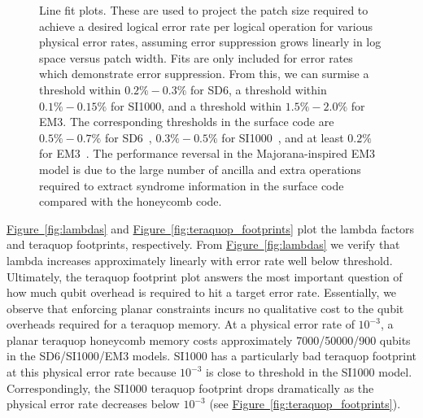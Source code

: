 \documentclass[onecolumn,unpublished,a4paper]{quantumarticle}
\theoremstyle{definition}
\theoremstyle{definition}
\theoremstyle{definition}
\newcommand{\fig}[1]{\hyperref[fig:#1]{Figure~\ref*{fig:#1}}}
\begin{document}
\begin{figure}[ht!]
    \centering
    \caption{
    Line fit plots.
    These are used to project the patch size required to achieve a desired logical error rate per logical operation for various physical error rates, assuming error suppression grows linearly in log space versus patch width.
    Fits are only included for error rates which demonstrate error suppression.  From this, we can surmise a threshold within $0.2\%-0.3\%$ for SD6, a threshold within $0.1\%-0.15\%$ for SI1000, and a threshold within $1.5\%-2.0\% $ for EM3.  
    The corresponding thresholds in the surface code are $0.5\%-0.7\%$ for SD6~\cite{gidney2021honeycombmemory}, $0.3\%-0.5\%$ for SI1000~\cite{gidney2021honeycombmemory}, and at least $0.2\%$ for EM3~\cite{chao2020optimization}.
    The performance reversal in the Majorana-inspired EM3 model is due to the large number of ancilla and extra operations required to extract syndrome information in the surface code compared with the honeycomb code.
    }
    \label{fig:line_fits}
\end{figure}

\fig{lambdas} and \fig{teraquop_footprints} plot the lambda factors and teraquop footprints, respectively.  
From \fig{lambdas} we verify that lambda increases approximately linearly with error rate well below threshold.
Ultimately, the teraquop footprint plot answers the most important question of how much qubit overhead is required to hit a target error rate.
Essentially, we observe that enforcing planar constraints incurs no qualitative cost to the qubit overheads required for a teraquop memory.
At a physical error rate of $10^{-3}$, a planar teraquop honeycomb memory costs approximately 7000/50000/900 qubits in the SD6/SI1000/EM3 models.
SI1000 has a particularly bad teraquop footprint at this physical error rate because $10^{-3}$ is close to threshold in the SI1000 model.
Correspondingly, the SI1000 teraquop footprint drops dramatically as the physical error rate decreases below $10^{-3}$ (see \fig{teraquop_footprints}).
\end{document}
